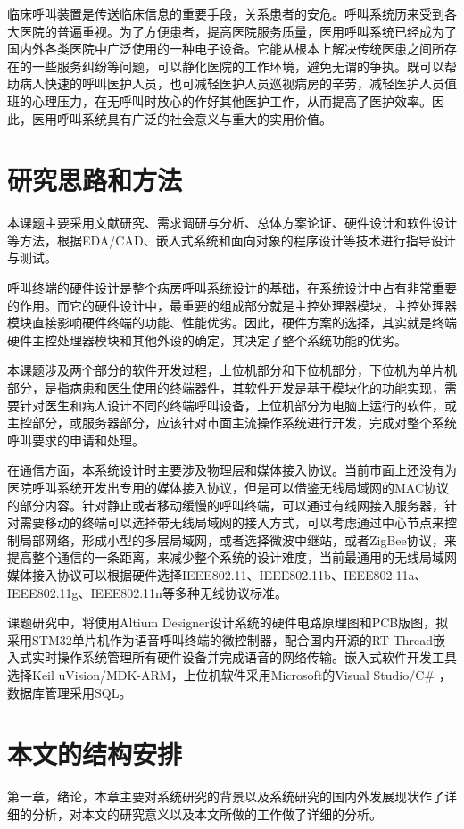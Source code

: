 临床呼叫装置是传送临床信息的重要手段，关系患者的安危。呼叫系统历来受到各大医院的普遍重视。为了方便患者，提高医院服务质量，医用呼叫系统已经成为了国内外各类医院中广泛使用的一种电子设备。它能从根本上解决传统医患之间所存在的一些服务纠纷等问题，可以静化医院的工作环境，避免无谓的争执。既可以帮助病人快速的呼叫医护人员，也可减轻医护人员巡视病房的辛劳，减轻医护人员值班的心理压力，在无呼叫时放心的作好其他医护工作，从而提高了医护效率。因此，医用呼叫系统具有广泛的社会意义与重大的实用价值。

\section{研究思路和方法}
本课题主要采用文献研究、需求调研与分析、总体方案论证、硬件设计和软件设计等方法，根据EDA/CAD、嵌入式系统和面向对象的程序设计等技术进行指导设计与测试。

呼叫终端的硬件设计是整个病房呼叫系统设计的基础，在系统设计中占有非常重要的作用。而它的硬件设计中，最重要的组成部分就是主控处理器模块，主控处理器模块直接影响硬件终端的功能、性能优劣。因此，硬件方案的选择，其实就是终端硬件主控处理器模块和其他外设的确定，其决定了整个系统功能的优劣。

本课题涉及两个部分的软件开发过程，上位机部分和下位机部分，下位机为单片机部分，是指病患和医生使用的终端器件，其软件开发是基于模块化的功能实现，需要针对医生和病人设计不同的终端呼叫设备，上位机部分为电脑上运行的软件，或主控部分，或服务器部分，应该针对市面主流操作系统进行开发，完成对整个系统呼叫要求的申请和处理。

在通信方面，本系统设计时主要涉及物理层和媒体接入协议。当前市面上还没有为医院呼叫系统开发出专用的媒体接入协议，但是可以借鉴无线局域网的MAC协议的部分内容。针对静止或者移动缓慢的呼叫终端，可以通过有线网接入服务器，针对需要移动的终端可以选择带无线局域网的接入方式，可以考虑通过中心节点来控制局部网络，形成小型的多层局域网，或者选择微波中继站，或者ZigBee协议，来提高整个通信的一条距离，来减少整个系统的设计难度，当前最通用的无线局域网媒体接入协议可以根据硬件选择IEEE802.11、IEEE802.11b、IEEE802.11a、IEEE802.11g、IEEE802.11n等多种无线协议标准。

课题研究中，将使用Altium Designer设计系统的硬件电路原理图和PCB版图，拟采用STM32单片机作为语音呼叫终端的微控制器，配合国内开源的RT-Thread嵌入式实时操作系统管理所有硬件设备并完成语音的网络传输。嵌入式软件开发工具选择Keil uVision/MDK-ARM，上位机软件采用Microsoft的Visual Studio/C\# ，数据库管理采用SQL。

\section{本文的结构安排}
第一章，绪论，本章主要对系统研究的背景以及系统研究的国内外发展现状作了详细的分析，对本文的研究意义以及本文所做的工作做了详细的分析。

